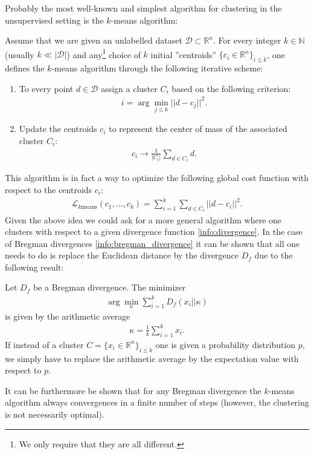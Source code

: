 {    Probably the most well-known and simplest algorithm for clustering in the unsupervised setting is the $k$-means algorithm:
    \begin{method}
        Assume that we are given an unlabelled dataset $\mathcal{D}\subset\mathbb{R}^n$. For every integer $k\in\mathbb{N}$ (usually $k\ll|\mathcal{D}|$) and any\footnote{We only require that they are all different.} choice of $k$ initial ''centroids'' $\{c_i\in\mathbb{R}^n\}_{i\leq k}$, one defines the $k$-means algorithm through the following iterative scheme:
        \begin{enumerate}
            \item To every point $d\in\mathcal{D}$ assign a cluster $C_i$ based on the following criterion:
            \begin{gather}
                i = \arg\min_{j\leq k}||d-c_j||^2.
            \end{gather}
            \item Update the centroids $c_i$ to represent the center of mass of the associated cluster $C_i$:
            \begin{gather}
                c_i\longrightarrow\frac{1}{|C_i|}\sum_{d\in C_i}d.
            \end{gather}
        \end{enumerate}
    \end{method}
    This algorithm is in fact a way to optimize the following global cost function with respect to the centroids $c_i$:
    \begin{gather}
        \mathcal{L}_{k\text{means}}(c_1,\ldots,c_k) = \sum_{i=1}^k\sum_{d\in C_i}||d - c_i||^2.
    \end{gather}
    Given the above idea we could ask for a more general algorithm where one clusters with respect to a given divergence function \ref{info:divergence}. In the case of Bregman divergences \ref{info:bregman_divergence} it can be shown that all one needs to do is replace the Euclidean distance by the divergence $D_f$ due to the following result:
    \begin{property}
        Let $D_f$ be a Bregman divergence. The minimizer
        \begin{gather}
            \arg\min_\kappa\sum_{i=1}^kD_f(x_i||\kappa)
        \end{gather}
        is given by the arithmetic average
        \begin{gather}
            \kappa = \frac{1}{k}\sum_{i=1}^kx_i.
        \end{gather}
        If instead of a cluster $C=\{x_i\in\mathbb{R}^n\}_{i\leq k}$ one is given a probability distribution $p$, we simply have to replace the arithmetic average by the expectation value with respect to $p$.
    \end{property}
    It can be furthermore be shown that for any Bregman divergence the $k$-means algorithm always convergences in a finite number of steps (however, the clustering is not necessarily optimal).

}
